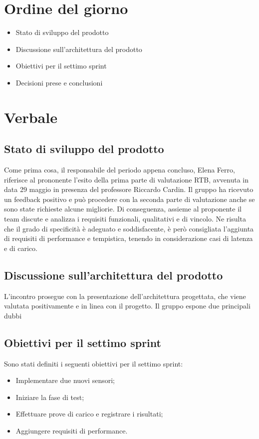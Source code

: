 \documentclass[italian,12pt]{article}
\begin{document}
\section{Ordine del giorno}
\begin{itemize}
	\item Stato di sviluppo del prodotto
	\item Discussione sull'architettura del prodotto
	\item Obiettivi per il settimo sprint
	\item Decisioni prese e conclusioni
\end{itemize}

\newpage

\section{Verbale}

\subsection{Stato di sviluppo del prodotto}
Come prima cosa, il responsabile del periodo appena concluso, Elena Ferro, riferisce al prononente l'esito della prima parte di valutazione RTB,
avvenuta in data 29 maggio in presenza del professore Riccardo Cardin. Il gruppo ha ricevuto un feedback positivo e può procedere con la seconda
parte di valutazione anche se sono state richieste alcune migliorie. Di conseguenza, assieme al proponente il team discute e analizza
i requisiti funzionali, qualitativi e di vincolo. Ne risulta che il grado di specificità è adeguato e soddisfacente, è però consigliata l'aggiunta 
di requisiti di performance e tempistica, tenendo in considerazione casi di latenza e di carico.

\subsection{Discussione sull'architettura del prodotto}
L'incontro prosegue con la presentazione dell'architettura progettata, che viene valutata positivamente e in linea con il progetto.
Il gruppo espone due principali dubbi

\subsection{Obiettivi per il settimo sprint}
Sono stati definiti i seguenti obiettivi per il settimo sprint:
\begin{itemize}
	\item Implementare due nuovi sensori;
	\item Iniziare la fase di test;
	\item Effettuare prove di carico e registrare i risultati;
	\item Aggiungere requisiti di performance.
\end{itemize}
\end{document}
